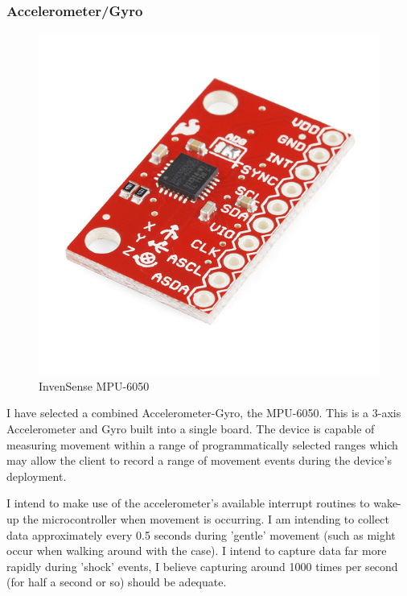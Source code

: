 \documentclass[a4paper, twoside]{article}
\begin{document}
\subsubsection{Accelerometer/Gyro}
\begin{figure}
	\begin{center}
		\includegraphics[scale=0.3]{images/mpu-6050.jpg}
	\end{center}
	\caption{InvenSense MPU-6050}
\end{figure}

I have selected a combined Accelerometer-Gyro, the MPU-6050. This is a 3-axis
Accelerometer and Gyro built into a single board. The device is capable of
measuring movement within a range of programmatically selected ranges which may
allow the client to record a range of movement events during the device's
deployment.

I intend to make use of the accelerometer's available interrupt routines to
wake-up the microcontroller when movement is occurring. I am intending to
collect data approximately every 0.5 seconds during 'gentle' movement (such as
might occur when walking around with the case). I intend to capture data far
more rapidly during 'shock' events, I believe capturing around 1000 times per
second (for half a second or so) should be adequate.
\end{document}
